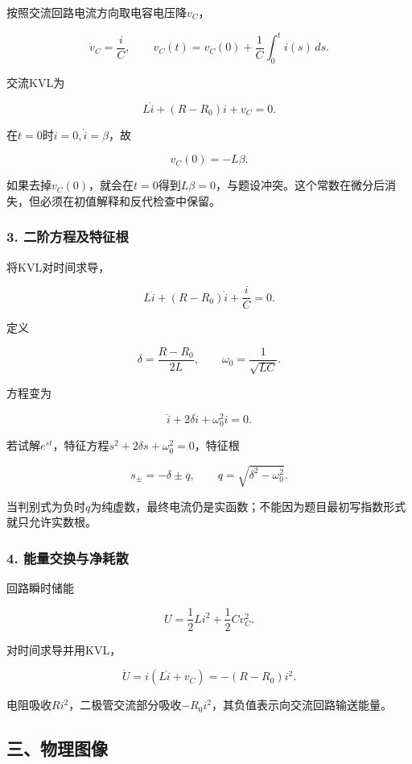 \documentclass[12pt,a4paper,fontset=fandol]{ctexart}
\begin{document}
按照交流回路电流方向取电容电压降\(v_C\)，

\[
\dot v_C=\frac{i}{C},
\qquad
v_C(t)=v_C(0)+\frac1C\int_0^ti(s)\,ds.
\]

交流KVL为

\[
L\dot i+(R-R_0)i+v_C=0.
\]

在\(t=0\)时\(i=0,\dot i=\beta\)，故

\[
\boxed{v_C(0)=-L\beta}.
\]

如果去掉\(v_C(0)\)，就会在\(t=0\)得到\(L\beta=0\)，与题设冲突。这个常数在微分后消失，但必须在初值解释和反代检查中保留。

\subsubsection{3.
二阶方程及特征根}\label{ux4e8cux9636ux65b9ux7a0bux53caux7279ux5f81ux6839}

将KVL对时间求导，

\[
L\ddot i+(R-R_0)\dot i+\frac iC=0.
\]

定义

\[
\delta=\frac{R-R_0}{2L},\qquad
\omega_0=\frac1{\sqrt{LC}}.
\]

方程变为

\[
\ddot i+2\delta\dot i+\omega_0^2i=0.
\]

若试解\(e^{st}\)，特征方程\(s^2+2\delta s+\omega_0^2=0\)，特征根

\[
s_\pm=-\delta\pm q,\qquad
q=\sqrt{\delta^2-\omega_0^2}.
\]

当判别式为负时\(q\)为纯虚数，最终电流仍是实函数；不能因为题目最初写指数形式就只允许实数根。

\subsubsection{4.
能量交换与净耗散}\label{ux80fdux91cfux4ea4ux6362ux4e0eux51c0ux8017ux6563}

回路瞬时储能

\[
U=\frac12Li^2+\frac12Cv_C^2.
\]

对时间求导并用KVL，

\[
\dot U=i(L\dot i+v_C)=-(R-R_0)i^2.
\]

电阻吸收\(Ri^2\)，二极管交流部分吸收\(-R_0i^2\)，其负值表示向交流回路输送能量。

\subsection{三、物理图像}\label{ux4e09ux7269ux7406ux56feux50cf-2}
\end{document}
